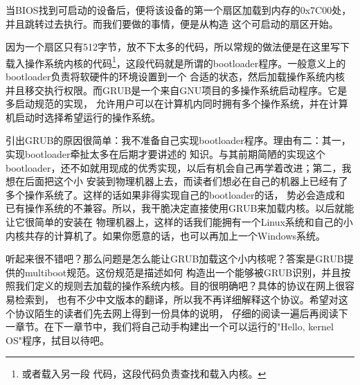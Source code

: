 \par 当BIOS找到可启动的设备后，便将该设备的第一个扇区加载到内存的0x7C00处，并且跳转过去执行。而我们要做的事情，便是从构造\allowbreak
这个可启动的扇区开始。

\par 因为一个扇区只有512字节，放不下太多的代码，所以常规的做法便是在这里写下载入操作系统内核的代码\footnote{或者载入另一段\allowbreak
代码，这段代码负责查找和载入内核。}，这段代码就是所谓的bootloader程序。一般意义上的bootloader负责将软硬件的环境设置到一个\allowbreak
合适的状态，然后加载操作系统内核并且移交执行权限。而GRUB是一个来自GNU项目的多操作系统启动程序。它是多启动规范的实现，\allowbreak
允许用户可以在计算机内同时拥有多个操作系统，并在计算机启动时选择希望运行的操作系统。

\par 引出GRUB的原因很简单：我不准备自己实现bootloader程序。理由有二：其一，实现bootloader牵扯太多在后期才要讲述的\allowbreak
知识。与其前期简陋的实现这个bootloader，还不如就用现成的优秀实现，以后有机会自己再学着改进；第二，我想在后面把这个小\allowbreak
安装到物理机器上去，而读者们想必在自己的机器上已经有了多个操作系统了。这样的话如果非得实现自己的bootloader的话，\allowbreak
势必会造成和已有操作系统的不兼容。所以，我干脆决定直接使用GRUB来加载内核。以后就能让它很简单的安装在\allowbreak
物理机器上，这样的话我们能拥有一个Linux系统和自己的小内核共存的计算机了。如果你愿意的话，也可以再加上一个Windows系统。

\par 听起来很不错吧？那么问题是怎么能让GRUB加载这个小内核呢？答案是GRUB提供的multiboot规范。这份规范是描述如何\allowbreak
构造出一个能够被GRUB识别，并且按照我们定义的规则去加载的操作系统内核。目的很明确吧？具体的协议在网上很容易检索到，\allowbreak
也有不少中文版本的翻译，所以我不再详细解释这个协议。希望对这个协议陌生的读者们先去网上得到一份具体的说明，\allowbreak
仔细的阅读一遍后再阅读下一章节。在下一章节中，我们将自己动手构建出一个可以运行的"Hello, kernel OS"程序，拭目以待吧。

